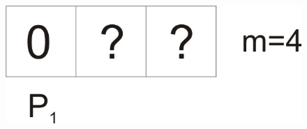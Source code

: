 \begin{frame}
\vspace{-1.5mm}
\begin{figure}[t]
		\includegraphics{figures/SlotMach2.jpg}
\end{figure}
\end{frame}


